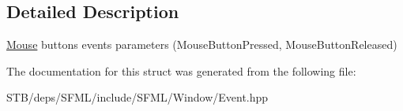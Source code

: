 \subsection{Detailed Description}
\hyperlink{classsf_1_1_mouse}{Mouse} buttons events parameters (Mouse\+Button\+Pressed, Mouse\+Button\+Released) 

The documentation for this struct was generated from the following file\+:\begin{DoxyCompactItemize}
\item 
S\+T\+B/deps/\+S\+F\+M\+L/include/\+S\+F\+M\+L/\+Window/Event.\+hpp\end{DoxyCompactItemize}

